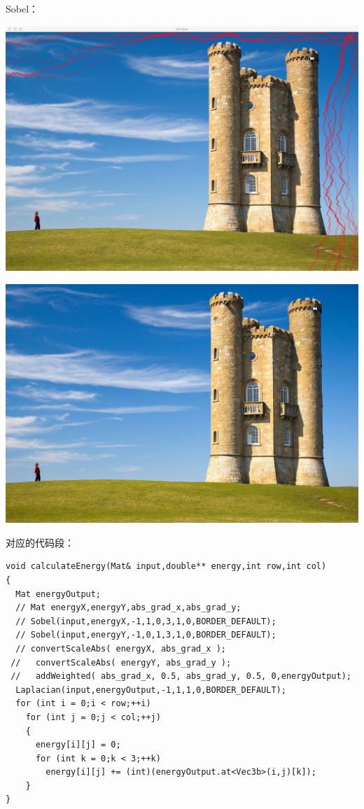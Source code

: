 \documentclass[10pt, a4paper]{article}
\begin{document}
    Sobel：

    \includegraphics[scale = .1]{skySobelseam.jpeg}

    \includegraphics[scale = .3]{skySobel.jpg}

    对应的代码段：
        \begin{lstlisting}
void calculateEnergy(Mat& input,double** energy,int row,int col)
{
  Mat energyOutput;
  // Mat energyX,energyY,abs_grad_x,abs_grad_y;
  // Sobel(input,energyX,-1,1,0,3,1,0,BORDER_DEFAULT);
  // Sobel(input,energyY,-1,0,1,3,1,0,BORDER_DEFAULT);
  // convertScaleAbs( energyX, abs_grad_x );
 //   convertScaleAbs( energyY, abs_grad_y );
 //   addWeighted( abs_grad_x, 0.5, abs_grad_y, 0.5, 0,energyOutput);
  Laplacian(input,energyOutput,-1,1,1,0,BORDER_DEFAULT);
  for (int i = 0;i < row;++i)
    for (int j = 0;j < col;++j)
    {
      energy[i][j] = 0;
      for (int k = 0;k < 3;++k)
        energy[i][j] += (int)(energyOutput.at<Vec3b>(i,j)[k]);
    }
}    
    \end{lstlisting}
\end{document}
